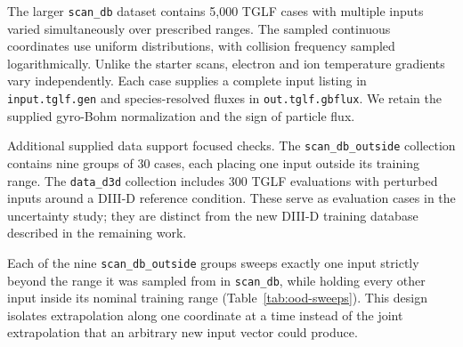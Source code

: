 \documentclass[12pt,letterpaper]{article}
\begin{document}
The larger \texttt{scan\_db} dataset contains 5,000 TGLF cases with multiple
inputs varied simultaneously over prescribed ranges. The sampled continuous
coordinates use uniform distributions, with collision
frequency sampled logarithmically. Unlike the starter scans, electron and ion
temperature gradients vary independently. Each case supplies a complete input
listing in \texttt{input.tglf.gen} and species-resolved fluxes in
\texttt{out.tglf.gbflux}. We retain the supplied gyro-Bohm normalization and
the sign of particle flux.

Additional supplied data support focused checks. The
\texttt{scan\_db\_outside} collection contains nine groups of 30 cases, each
placing one input outside its training range. The \texttt{data\_d3d}
collection includes 300 TGLF evaluations with perturbed inputs around a
DIII-D reference condition. These serve as evaluation cases in the uncertainty
study; they are distinct from the new DIII-D training database described in
the remaining work.

Each of the nine \texttt{scan\_db\_outside} groups sweeps exactly one input
strictly beyond the range it was sampled from in \texttt{scan\_db}, while
holding every other input inside its nominal training range
(Table~\ref{tab:ood-sweeps}). This design isolates extrapolation along one
coordinate at a time instead of the joint extrapolation that an arbitrary new
input vector could produce.
\end{document}

